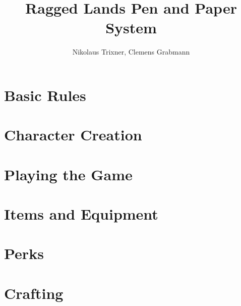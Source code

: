 \documentclass{report}
\begin{document}
	\title{Ragged Lands Pen and Paper System}
	\author{Nikolaus Trixner, Clemens Grabmann}
		
	\maketitle
	
	\tableofcontents

%	
%	

\part{Basic Rules}
	
\newpage

\part{Character Creation}
	
	
	
%	
%	
\newpage

\part{Playing the Game}
	
	
	
	
\newpage

\part{Items and Equipment}
	
	
	
\newpage

\part{Perks}
	
	
	
	
	
	
\newpage

\part{Crafting}
	
	\newpage
	
\end{document}
